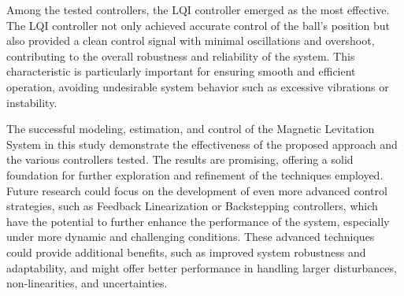 Among the tested controllers, the LQI controller emerged as the most effective.
The LQI controller not only achieved accurate control of the ball's position but also provided a clean control signal with minimal oscillations and overshoot, contributing to the overall robustness and reliability of the system.
This characteristic is particularly important for ensuring smooth and efficient operation, avoiding undesirable system behavior such as excessive vibrations or instability.

The successful modeling, estimation, and control of the Magnetic Levitation System in this study demonstrate the effectiveness of the proposed approach and the various controllers tested.
The results are promising, offering a solid foundation for further exploration and refinement of the techniques employed.
Future research could focus on the development of even more advanced control strategies, such as Feedback Linearization or Backstepping controllers, which have the potential to further enhance the performance of the system, especially under more dynamic and challenging conditions.
These advanced techniques could provide additional benefits, such as improved system robustness and adaptability, and might offer better performance in handling larger disturbances, non-linearities, and uncertainties.
